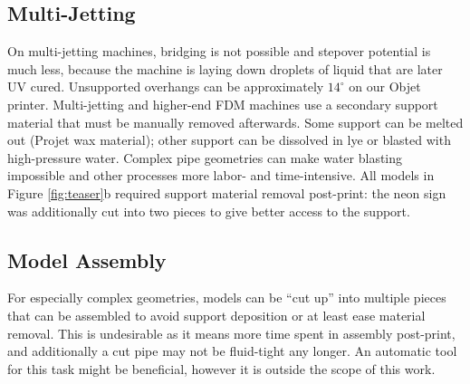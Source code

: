 \subsection{Multi-Jetting}
On multi-jetting machines, bridging is not possible and stepover potential is much less, because the machine is laying down droplets of liquid that are later UV cured.  Unsupported overhangs can be approximately $14^{\circ}$ on our Objet printer.  Multi-jetting and higher-end FDM machines use a secondary support material that must be manually removed afterwards. Some support can be melted out (Projet wax material); other support can be dissolved in lye or blasted with high-pressure water. Complex pipe geometries can make water blasting impossible and other processes more labor- and time-intensive.  All models in Figure \ref{fig:teaser}b required support material removal post-print: the neon sign was additionally cut into two pieces to give better access to the support.

\subsection{Model Assembly}
For especially complex geometries, models can be ``cut up'' into multiple pieces that can be assembled to avoid support deposition or at least ease material removal. This is undesirable as it means more time spent in assembly post-print, and additionally a cut pipe may not be fluid-tight any longer.  An automatic tool for this task might be beneficial, however it is outside the scope of this work.